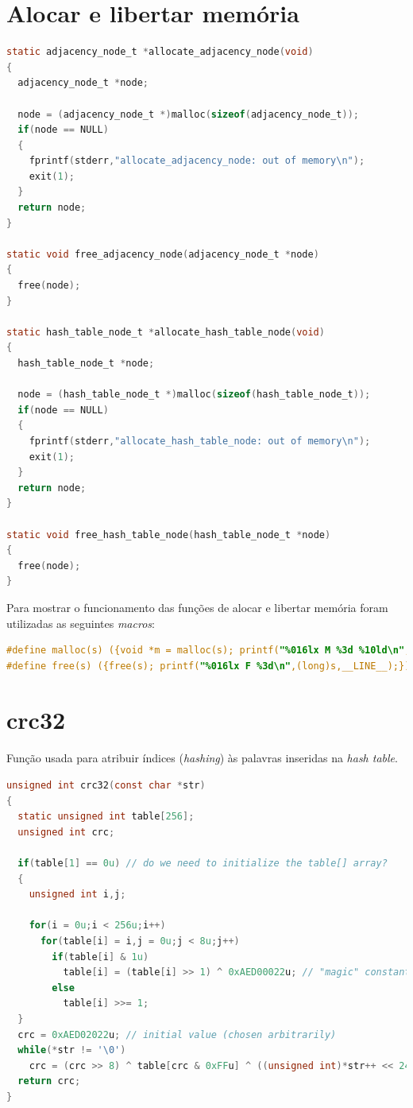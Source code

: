 \section{Alocar e libertar memória}
	\begin{lstlisting}[language=C]
static adjacency_node_t *allocate_adjacency_node(void)
{
  adjacency_node_t *node;

  node = (adjacency_node_t *)malloc(sizeof(adjacency_node_t));
  if(node == NULL)
  {
    fprintf(stderr,"allocate_adjacency_node: out of memory\n");
    exit(1);
  }
  return node;
}

static void free_adjacency_node(adjacency_node_t *node)
{
  free(node);
}

static hash_table_node_t *allocate_hash_table_node(void)
{
  hash_table_node_t *node;

  node = (hash_table_node_t *)malloc(sizeof(hash_table_node_t));
  if(node == NULL)
  {
    fprintf(stderr,"allocate_hash_table_node: out of memory\n");
    exit(1);
  }
  return node;
}

static void free_hash_table_node(hash_table_node_t *node)
{
  free(node);
}
    \end{lstlisting}
    \pagebreak
    Para mostrar o funcionamento das funções de alocar e libertar memória foram utilizadas as seguintes \textit{macros}:
    \begin{lstlisting}[language=C]
#define malloc(s) ({void *m = malloc(s); printf("%016lx M %3d %10ld\n",(long)m,__LINE__,(long)(s)); m;})
#define free(s) ({free(s); printf("%016lx F %3d\n",(long)s,__LINE__);})
    \end{lstlisting}
	\section{crc32}
	\label{crc32}
Função usada para atribuir índices (\textit{hashing}) às palavras inseridas na \textit{hash table}.
	\begin{lstlisting}[language=C]
unsigned int crc32(const char *str)
{
  static unsigned int table[256];
  unsigned int crc;

  if(table[1] == 0u) // do we need to initialize the table[] array?
  {
    unsigned int i,j;

    for(i = 0u;i < 256u;i++)
      for(table[i] = i,j = 0u;j < 8u;j++)
        if(table[i] & 1u)
          table[i] = (table[i] >> 1) ^ 0xAED00022u; // "magic" constant
        else
          table[i] >>= 1;
  }
  crc = 0xAED02022u; // initial value (chosen arbitrarily)
  while(*str != '\0')
    crc = (crc >> 8) ^ table[crc & 0xFFu] ^ ((unsigned int)*str++ << 24);
  return crc;
}
	\end{lstlisting}
	
